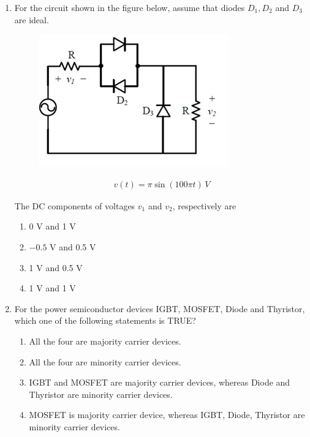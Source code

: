 \documentclass[journal,12pt,onecolumn]{IEEEtran}
\theoremstyle{remark}
\begin{document}
\begin{enumerate}
\item For the circuit shown in the figure below, assume that diodes $D_1, D_2$ and $D_3$ are ideal.  
\begin{figure}[h!]
    \centering
    \includegraphics[width=0.5\columnwidth]{figs/14.png}
    \label{fig:placeholder}
\end{figure}
\begin{align*}
    v(t) = \pi \sin(100\pi t) \, V
\end{align*}

The DC components of voltages $v_1$ and $v_2$, respectively are  

\begin{multicols}{2}
\begin{enumerate}
\item 0 V and 1 V  
\item $-0.5$ V and 0.5 V  
\item 1 V and 0.5 V  
\item 1 V and 1 V  
\end{enumerate}
\end{multicols}




\item For the power semiconductor devices IGBT, MOSFET, Diode and Thyristor, which one of the following statements is TRUE?  

\begin{multicols}{2}
\begin{enumerate}
\item All the four are majority carrier devices.  
\item All the four are minority carrier devices.  
\item IGBT and MOSFET are majority carrier devices, whereas Diode and Thyristor are minority carrier devices.  
\item MOSFET is majority carrier device, whereas IGBT, Diode, Thyristor are minority carrier devices.  
\end{enumerate}
\end{multicols}


\end{enumerate}
\end{document}
